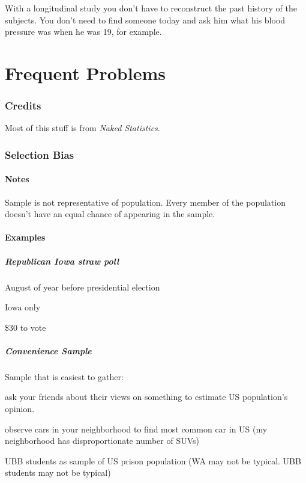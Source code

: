 \documentclass[landscape]{exam}
\begin{document}
  With a longitudinal study you don't have to reconstruct the past history of
  the subjects. You don't need to find someone today and ask him what his blood
  pressure was when he was 19, for example.

  \part{Frequent Problems}

  \section{Credits}
  Most of this stuff is from {\em Naked Statistics}.

  \section{Selection Bias}
  \subsection{Notes}
  Sample is not representative of population.  Every member of the population
  doesn't have an equal chance of appearing in the sample.

  \subsection{Examples}
  \subsubsection{Republican Iowa straw poll}

  \begin{itemize*}
    \item August of year before presidential election
    \item Iowa only
    \item \$30 to vote
  \end{itemize*}

  \subsubsection{Convenience Sample}
  Sample that is easiest to gather:

  \begin{itemize*}
    \item ask your friends about their views on something to estimate US population's opinion.
    \item observe cars in your neighborhood to find most common car in US (my
      neighborhood has disproportionate number of SUVs)
    \item UBB students as sample of US prison population (WA may not be typical.
      UBB students may not be typical)
  \end{itemize*}
\end{document}
